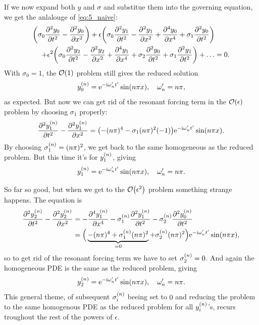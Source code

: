 \documentclass[11pt,letter, swedish, english
]{article}
\begin{document}
If we now expand both $y$ and $\sigma$ and substitue them into the
governing equation, we get the anlalouge of \eqref{eq:5_naive}: 
\begin{equation}
\begin{aligned}
\qty(\sigma_0\pdv[2]{y_0}{t} - \pdv[2]{y_0}{x})
+\epsilon\qty(\sigma_0\pdv[2]{y_1}{t} - \pdv[2]{y_1}{x} 
+ \pdv[4]{y_0}{x} + \sigma_1\pdv[2]{y_0}{t})&\\
+\epsilon^2\qty(\sigma_0\pdv[2]{y_2}{t} 
- \pdv[2]{y_2}{x} + \pdv[4]{y_1}{x} 
+ \sigma_2\pdv[2]{y_0}{t} + \sigma_1\pdv[2]{y_1}{t}) 
+\ldots &= 0.
\end{aligned}
\end{equation}
With $\sigma_0=1$, the $\order{1}$ problem still gives the reduced
solution
\begin{equation}
\yn_0=\ee^{-\ii\omega_n't'}\sin(n\pi x) \qcomma \omega_n'=n\pi,
\end{equation}
as expected. But now we can get rid of the resonant forcing term in
the $\order{\epsilon}$ problem by choosing $\sigma_1$ properly:
\begin{equation}
\pdv[2]{\ensuremath{}y^{(n)}_1}{t} - \pdv[2]{\ensuremath{}y^{(n)}_1}{x} 
=\qty(-(n\pi)^4 -\sigma_1(n\pi)^2(-1))\mathrm{e}^{-\mathrm{i}\omega_n't'}\sin(n\pi x).
\end{equation}
By choosing $\sigma^{(n)}_1=(n\pi)^2$, we get back to the same homogeneous as
the reduced problem. But this time it's for $y^{(n)}_1$, giving
\begin{equation}
\yn_1=\ee^{-\ii\omega_n't'}\sin(n\pi x) \qcomma \omega_n'=n\pi.
\end{equation}

So far so good, but when we get to the $\order{\epsilon^2}$ problem
something strange happens. The equation is 
\begin{equation}
\begin{aligned}
\pdv[2]{\ensuremath{}y^{(n)}_2}{t} - \pdv[2]{\ensuremath{}y^{(n)}_2}{x} 
&=-\pdv[4]{\ensuremath{}y^{(n)}_1}{x}-\sigma^{(n)}_1\pdv[2]{\ensuremath{}y^{(n)}_1}{t}-\sigma^{(n)}_2\pdv[2]{\ensuremath{}y^{(n)}_0}{t} \\
&=\Big(\underbrace{-(n\pi)^4 +\sigma^{(n)}_1(n\pi)^2}_{=0} + \sigma^{(n)}_2(n\pi)^2\Big)
\mathrm{e}^{-\mathrm{i}\omega_n't'}\sin(n\pi x),
\end{aligned}
\end{equation}
so to get rid of the resonant forcing term we have to set
$\sigma^{(n)}_2=0$. And again the homogeneous PDE is the same as the reduced
problem, giving
\begin{equation}
\yn_2=\ee^{-\ii\omega_n't'}\sin(n\pi x) \qcomma \omega_n'=n\pi.
\end{equation}
This general theme, of subsequent $\sigma^{(n)}_i$ beeing set to $0$ and
reducing the problem to the same homogenous PDE as the reduced problem
for all $y^{(n)}_i$'s, recurs troughout the rest of the powers of
$\epsilon$. 
\end{document}
